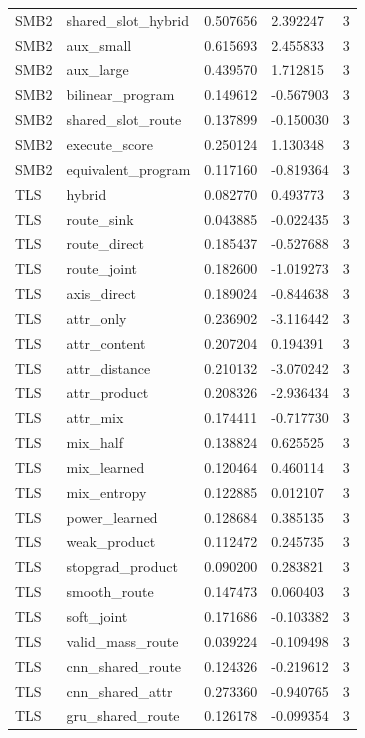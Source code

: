 \begin{tabular}{lllll}
SMB2 & shared\_slot\_hybrid & 0.507656 & 2.392247 & 3 \\
SMB2 & aux\_small & 0.615693 & 2.455833 & 3 \\
SMB2 & aux\_large & 0.439570 & 1.712815 & 3 \\
SMB2 & bilinear\_program & 0.149612 & -0.567903 & 3 \\
SMB2 & shared\_slot\_route & 0.137899 & -0.150030 & 3 \\
SMB2 & execute\_score & 0.250124 & 1.130348 & 3 \\
SMB2 & equivalent\_program & 0.117160 & -0.819364 & 3 \\
TLS & hybrid & 0.082770 & 0.493773 & 3 \\
TLS & route\_sink & 0.043885 & -0.022435 & 3 \\
TLS & route\_direct & 0.185437 & -0.527688 & 3 \\
TLS & route\_joint & 0.182600 & -1.019273 & 3 \\
TLS & axis\_direct & 0.189024 & -0.844638 & 3 \\
TLS & attr\_only & 0.236902 & -3.116442 & 3 \\
TLS & attr\_content & 0.207204 & 0.194391 & 3 \\
TLS & attr\_distance & 0.210132 & -3.070242 & 3 \\
TLS & attr\_product & 0.208326 & -2.936434 & 3 \\
TLS & attr\_mix & 0.174411 & -0.717730 & 3 \\
TLS & mix\_half & 0.138824 & 0.625525 & 3 \\
TLS & mix\_learned & 0.120464 & 0.460114 & 3 \\
TLS & mix\_entropy & 0.122885 & 0.012107 & 3 \\
TLS & power\_learned & 0.128684 & 0.385135 & 3 \\
TLS & weak\_product & 0.112472 & 0.245735 & 3 \\
TLS & stopgrad\_product & 0.090200 & 0.283821 & 3 \\
TLS & smooth\_route & 0.147473 & 0.060403 & 3 \\
TLS & soft\_joint & 0.171686 & -0.103382 & 3 \\
TLS & valid\_mass\_route & 0.039224 & -0.109498 & 3 \\
TLS & cnn\_shared\_route & 0.124326 & -0.219612 & 3 \\
TLS & cnn\_shared\_attr & 0.273360 & -0.940765 & 3 \\
TLS & gru\_shared\_route & 0.126178 & -0.099354 & 3 \\

\end{tabular}
